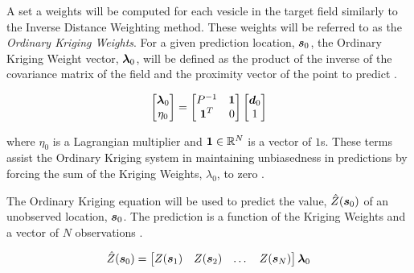A set a weights will be computed for each vesicle in the target field similarly to the Inverse Distance Weighting method. These weights will be referred to as the \textit{Ordinary Kriging Weights}. For a given prediction location, ${\it{\boldsymbol{s}}}_0$, the Ordinary Kriging Weight vector, ${\it{\boldsymbol{\lambda}}}_0$, will be defined as the product of the inverse of the covariance matrix of the field and the proximity vector of the point to predict \cite{felus:srn}.

\begin{equation}
    \begin{bmatrix}
    {\it{\boldsymbol{\lambda}}}_{0} \\
    \eta_0
    \end{bmatrix} = \begin{bmatrix} P^{-1} & {\it{\boldsymbol{1}}} \\
                                    {\it{\boldsymbol{1}}}^T & 0 \end{bmatrix}
                                    \begin{bmatrix} 
                                    {\it{\boldsymbol{d}}}_{0} \\
                                    1
                                    \end{bmatrix}
    \label{eq:krigweights}
\end{equation}

\noindent where $\eta_0$ is a Lagrangian multiplier and ${\it{\boldsymbol{1}}} \in \mathbb{R}^{N}$ is a vector of $1$s. These terms assist the Ordinary Kriging system in maintaining unbiasedness in predictions by forcing the sum of the Kriging Weights, $\lambda_0$, to zero \cite{felus:srn}. 

The Ordinary Kriging equation will be used to predict the value, $\hat{Z}({\it{\boldsymbol{s}}}_0)$ of an unobserved location, ${\it{\boldsymbol{s}}}_0$. The prediction is a function of the Kriging Weights and a vector of $N$ observations \cite{felus:srn}. 

\begin{equation}
    \hat{Z}({\it{\boldsymbol{s}}}_0) = \begin{bmatrix} Z({\it{\boldsymbol{s}}}_1) & Z({\it{\boldsymbol{s}}}_2) & \dots & Z({\it{\boldsymbol{s}}}_N) \end{bmatrix}{\it{\boldsymbol{\lambda}}}_{0}
    \label{eq:krigeq}
\end{equation}

